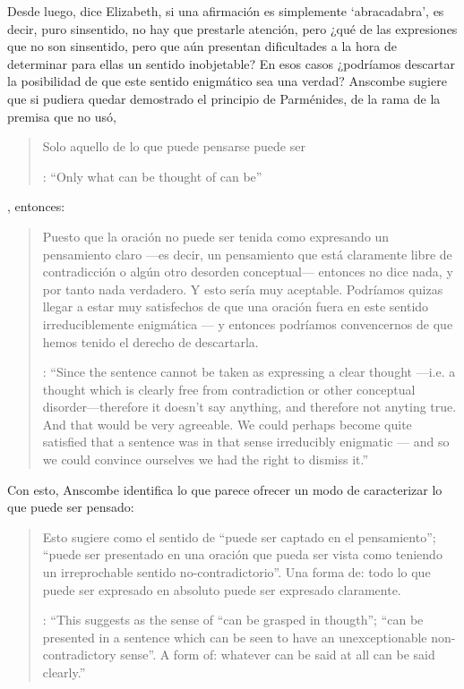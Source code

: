 Desde luego, dice Elizabeth, si una afirmación es simplemente `abracadabra', es decir, puro sinsentido, no hay que prestarle atención, pero ¿qué de las expresiones que no son sinsentido, pero que aún presentan dificultades a la hora de determinar para ellas un sentido inobjetable? En esos casos ¿podríamos descartar la posibilidad de que este sentido enigmático sea una verdad? Anscombe sugiere que si pudiera quedar demostrado el principio de Parménides, de la rama de la premisa que no usó, \blockquote[{\cite[6]{anscombe1981parmenides:pmc}}: \enquote{Only what can be thought of can be}]{Solo aquello de lo que puede pensarse puede ser}, entonces: \blockquote[{\cite[8]{anscombe1981parmenides:pmc}}: \enquote{Since the sentence cannot be taken as expressing a clear thought ---i.e. a thought which is clearly free from contradiction or other conceptual disorder---therefore it doesn't say anything, and therefore not anyting true. And that would be very agreeable. We could perhaps become quite satisfied that a sentence was in that sense irreducibly enigmatic --- and so we could convince ourselves we had the right to dismiss it.}]{Puesto que la oración no puede ser tenida como expresando un pensamiento claro ---es decir, un pensamiento que está claramente libre de contradicción o algún otro desorden conceptual--- entonces no dice nada, y por tanto nada verdadero. Y esto sería muy aceptable. Podríamos quizas llegar a estar muy satisfechos de que una oración fuera en este sentido irreduciblemente enigmática --- y entonces podríamos convencernos de que hemos tenido el derecho de descartarla.}

Con esto, Anscombe identifica lo que parece ofrecer un modo de caracterizar lo que puede ser pensado: \blockquote[{\cite[8]{anscombe1981parmenides:pmc}}: \enquote{This suggests as the sense of ``can be grasped in thougth''; ``can be presented in a sentence which can be seen to have an unexceptionable non-contradictory sense''. A form of: whatever can be said at all can be said clearly.}]{Esto sugiere como el sentido de ``puede ser captado en el pensamiento''; ``puede ser presentado en una oración que pueda ser vista como teniendo un irreprochable sentido no-contradictorio''. Una forma de: todo lo que puede ser expresado en absoluto puede ser expresado claramente.}

